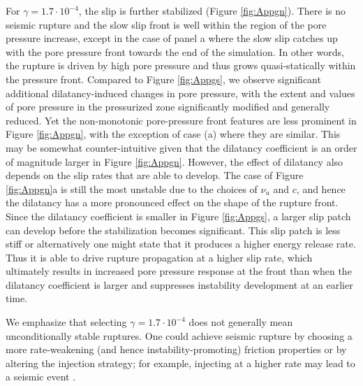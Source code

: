 \documentclass[draft]{agujournal2019}
\begin{document}
For $\gamma = 1.7 \cdot 10^{-4}$, the slip is further stabilized (Figure \ref{fig:Appgn}). There is no seismic rupture and the slow slip front is well within the region of the pore pressure increase, except in the case of panel a where the slow slip catches up with the pore pressure front towards the end of the simulation. In other words, the rupture is driven by high pore pressure and thus grows quasi-statically within the pressure front. Compared to Figure \ref{fig:Appgs}, we observe significant additional dilatancy-induced changes in pore pressure, with the extent and values of pore pressure in the pressurized zone significantly modified and generally reduced. Yet the non-monotonic pore-pressure front features are less prominent in Figure \ref{fig:Appgn}, with the exception of case (a) where they are similar.  This may be somewhat counter-intuitive given that the dilatancy coefficient is an order of magnitude larger in Figure \ref{fig:Appgn}. However, the effect of dilatancy also depends on the slip rates that are able to develop. The case of Figure \ref{fig:Appgn}a is still the most unstable due to the choices of $\nu_u$ and $c$, and hence the dilatancy has a more pronounced effect on the shape of the rupture front. Since the dilatancy coefficient is smaller in Figure \ref{fig:Appgs}, a larger slip patch can develop before the stabilization becomes significant. This slip patch is less stiff or alternatively one might state that it produces a higher energy release rate. Thus it is able to drive rupture propagation at a higher slip rate, which ultimately results in increased pore pressure response at the front than when the dilatancy coefficient is larger and suppresses instability development at an earlier time. 

We emphasize that selecting $\gamma = 1.7 \cdot 10^{-4}$ does not generally mean unconditionally stable ruptures. One could achieve seismic rupture by choosing a more rate-weakening (and hence instability-promoting) friction properties or by altering the injection strategy; for example, injecting at a higher rate may lead to a seismic event \cite{Gori2021}.
\end{document}
